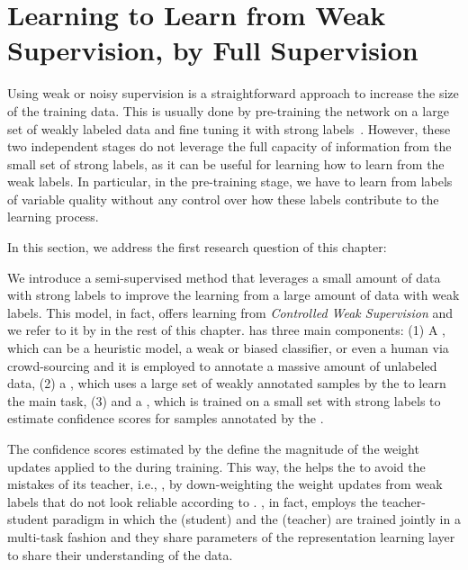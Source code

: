 \section{Learning to Learn from Weak Supervision, by Full Supervision}
\label{sec:meta_learning}
Using weak or noisy supervision is a straightforward approach to increase the size of the training data. This is usually done by pre-training the network on a large set of weakly labeled data and fine tuning it with strong labels~\citep{Dehghani:2017:SIGIR,Severyn:2015:SIGIR}. 
However, these two independent stages do not leverage the full capacity of information from the small set of strong labels, as it can be useful for learning how to learn from the weak labels.  In particular, in the pre-training stage, we have to learn from labels of variable quality without any control over how these labels contribute to the learning process.

In this section, we address the first research question of this chapter:

We introduce a semi-supervised method that leverages a small amount of data with strong labels to improve the learning from a large amount of data with weak labels. This model, in fact, offers learning from \emph{Controlled Weak Supervision} and we refer to it by \emph{\cws} in the rest of this chapter.
%
\cws has three main components:
(1) A \wa, which can be a heuristic model, a weak or biased classifier, or even a human via crowd-sourcing and it is employed to annotate a massive amount of unlabeled data, 
(2) a \tnet, which uses a large set of weakly annotated samples by the \wa to learn the main task, 
(3) and a \cnet, which is trained on a small set with strong labels to estimate confidence scores for samples annotated by the \wa. 

The confidence scores estimated by the \cnet define the magnitude of the weight updates applied to the \tnet during training. This way, the \cnet helps the \tnet to avoid the mistakes of its teacher, i.e., \wa, by down-weighting the weight updates from weak labels that do not look reliable according to \cnet.
%
\cws, in fact, employs the teacher-student paradigm in which the \tnet (student) and the \cnet (teacher) are trained jointly in a multi-task fashion and they share parameters of the representation learning layer to share their understanding of the data.


